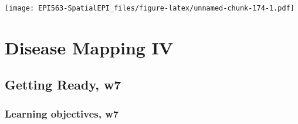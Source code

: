 \documentclass[
]{book}
\begin{document}
\texttt{[image: EPI563-SpatialEPI\_files/figure-latex/unnamed-chunk-174-1.pdf]}

\hypertarget{disease-mapping-iv}{%
\chapter{Disease Mapping IV}\label{disease-mapping-iv}}

\hypertarget{getting-ready-w7}{%
\section{Getting Ready, w7}\label{getting-ready-w7}}

\hypertarget{learning-objectives-w7}{%
\subsection{Learning objectives, w7}\label{learning-objectives-w7}}

 
  \providecommand{\huxb}[2]{\arrayrulecolor[RGB]{#1}\global\arrayrulewidth=#2pt}
  \providecommand{\huxvb}[2]{\color[RGB]{#1}\vrule width #2pt}
  \providecommand{\huxtpad}[1]{\rule{0pt}{#1}}
  \providecommand{\huxbpad}[1]{\rule[-#1]{0pt}{#1}}
\end{document}
